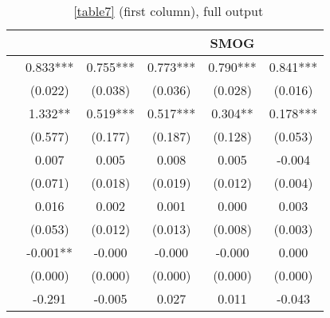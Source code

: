 \begin{table}[H]
    \footnotesize
    \centering
    \begin{threeparttable}
        \caption{~\autoref{table7} (first column), full output}
        \label{tableC5}
        \begin{tabular}{p{3cm}S@{}S@{}S@{}S@{}S@{}}
            \toprule
            &{}&{}&{}&{SMOG}&{}\\
            \midrule
                    &       0.833***&       0.755***&       0.773***&       0.790***&       0.841***\\
                                          &     (0.022)   &     (0.038)   &     (0.036)   &     (0.028)   &     (0.016)   \\
                  &       1.332** &       0.519***&       0.517***&       0.304** &       0.178***\\
                                          &     (0.577)   &     (0.177)   &     (0.187)   &     (0.128)   &     (0.053)   \\
                  &       0.007   &       0.005   &       0.008   &       0.005   &      -0.004   \\
                                          &     (0.071)   &     (0.018)   &     (0.019)   &     (0.012)   &     (0.004)   \\
                  &       0.016   &       0.002   &       0.001   &       0.000   &       0.003   \\
                                          &     (0.053)   &     (0.012)   &     (0.013)   &     (0.008)   &     (0.003)   \\
                 &      -0.001** &      -0.000   &      -0.000   &      -0.000   &       0.000   \\
                                          &     (0.000)   &     (0.000)   &     (0.000)   &     (0.000)   &     (0.000)   \\
                &      -0.291   &      -0.005   &       0.027   &       0.011   &      -0.043   \\

\end{tabular}
\end{threeparttable}
\end{table}
